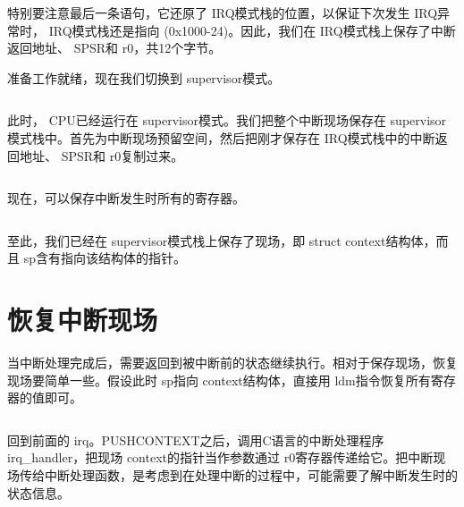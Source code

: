 \documentclass[main.tex]{subfiles}
\begin{document}
\begin{CJK*}{UTF8}{song}
特别要注意最后一条语句，它还原了 IRQ模式栈的位置，以保证下次发生 IRQ异常时， IRQ模式栈还是指向 (0x1000-24)。因此，我们在 IRQ模式栈上保存了中断返回地址、 SPSR和 r0，共12个字节。
\par
准备工作就绪，现在我们切换到 supervisor模式。

\begin{code}
\label{code:3-10}
\inputminted[firstline=49,lastline=52,linenos,numbersep=5pt,frame=lines,framesep=2mm]{gas}{src/chapter03/kernel/entry.S}
\end{code}

此时， CPU已经运行在 supervisor模式。我们把整个中断现场保存在 supervisor模式栈中。首先为中断现场预留空间，然后把刚才保存在 IRQ模式栈中的中断返回地址、 SPSR和 r0复制过来。

\begin{code}
\label{code:3-11}
\inputminted[firstline=53,lastline=59,linenos,numbersep=5pt,frame=lines,framesep=2mm]{gas}{src/chapter03/kernel/entry.S}
\end{code}

现在，可以保存中断发生时所有的寄存器。

\begin{code}
\label{code:3-12}
\inputminted[firstline=60,lastline=63,linenos,numbersep=5pt,frame=lines,framesep=2mm]{gas}{src/chapter03/kernel/entry.S}
\end{code}
至此，我们已经在 supervisor模式栈上保存了现场，即 struct context结构体，而且 sp含有指向该结构体的指针。

\section{恢复中断现场}
当中断处理完成后，需要返回到被中断前的状态继续执行。相对于保存现场，恢复现场要简单一些。假设此时 sp指向 context结构体，直接用 ldm指令恢复所有寄存器的值即可。

\begin{code}
\label{code:3-13}
\inputminted[firstline=65,lastline=71,linenos,numbersep=5pt,frame=lines,framesep=2mm]{gas}{src/chapter03/kernel/entry.S}
\end{code}

回到前面的 irq。PUSH\-CONTEXT之后，调用C语言的中断处理程序 irq\_\-handler，把现场 context的指针当作参数通过 r0寄存器传递给它。把中断现场传给中断处理函数，是考虑到在处理中断的过程中，可能需要了解中断发生时的状态信息。


\end{CJK*}
\end{document}
